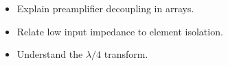 \begin{objectives}
\begin{itemize}[leftmargin=1.4em,itemsep=2pt]
\item Explain preamplifier decoupling in arrays.
\item Relate low input impedance to element isolation.
\item Understand the $\lambda/4$ transform.
\end{itemize}
\end{objectives}
